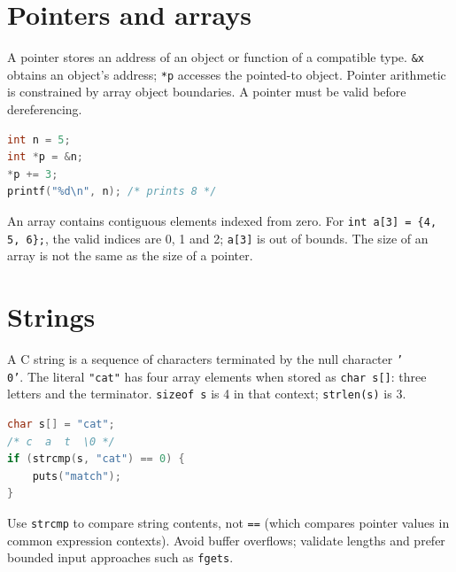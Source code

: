 \documentclass[11pt,a4paper]{article}
\begin{document}
\section{Pointers and arrays}
A pointer stores an address of an object or function of a compatible type. \texttt{\&x} obtains an object's address; \texttt{*p} accesses the pointed-to object. Pointer arithmetic is constrained by array object boundaries. A pointer must be valid before dereferencing.
\begin{lstlisting}[language=C]
int n = 5;
int *p = &n;
*p += 3;
printf("%d\n", n); /* prints 8 */
\end{lstlisting}
\begin{center}\end{center}
An array contains contiguous elements indexed from zero. For \texttt{int a[3] = \{4, 5, 6\};}, the valid indices are 0, 1 and 2; \texttt{a[3]} is out of bounds. The size of an array is not the same as the size of a pointer.
\begin{center}\end{center}
\section{Strings}
A C string is a sequence of characters terminated by the null character \texttt{'\\0'}. The literal \texttt{"cat"} has four array elements when stored as \texttt{char s[]}: three letters and the terminator. \texttt{sizeof s} is 4 in that context; \texttt{strlen(s)} is 3.
\begin{lstlisting}[language=C]
char s[] = "cat";
/* c  a  t  \0 */
if (strcmp(s, "cat") == 0) {
    puts("match");
}
\end{lstlisting}
Use \texttt{strcmp} to compare string contents, not \texttt{==} (which compares pointer values in common expression contexts). Avoid buffer overflows; validate lengths and prefer bounded input approaches such as \texttt{fgets}.
\end{document}
